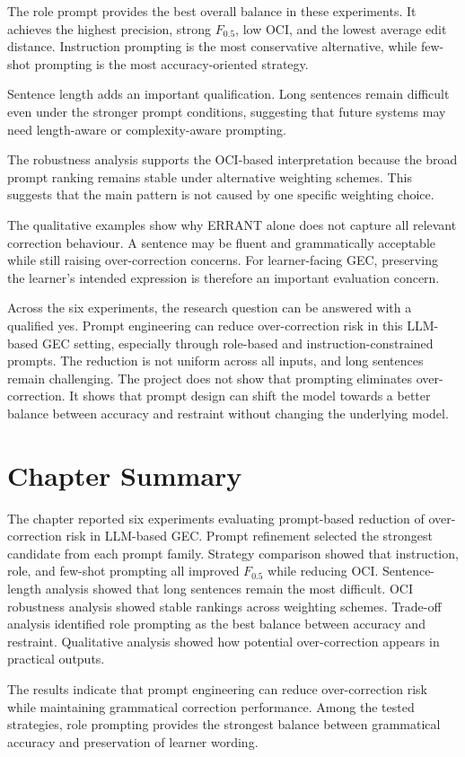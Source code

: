 The role prompt provides the best overall balance in these experiments. It achieves the highest precision, strong $F_{0.5}$, low OCI, and the lowest average edit distance. Instruction prompting is the most conservative alternative, while few-shot prompting is the most accuracy-oriented strategy.

Sentence length adds an important qualification. Long sentences remain difficult even under the stronger prompt conditions, suggesting that future systems may need length-aware or complexity-aware prompting.

The robustness analysis supports the OCI-based interpretation because the broad prompt ranking remains stable under alternative weighting schemes. This suggests that the main pattern is not caused by one specific weighting choice.

The qualitative examples show why ERRANT alone does not capture all relevant correction behaviour. A sentence may be fluent and grammatically acceptable while still raising over-correction concerns. For learner-facing GEC, preserving the learner's intended expression is therefore an important evaluation concern.

Across the six experiments, the research question can be answered with a qualified yes. Prompt engineering can reduce over-correction risk in this LLM-based GEC setting, especially through role-based and instruction-constrained prompts. The reduction is not uniform across all inputs, and long sentences remain challenging. The project does not show that prompting eliminates over-correction. It shows that prompt design can shift the model towards a better balance between accuracy and restraint without changing the underlying model.

\section{Chapter Summary}

The chapter reported six experiments evaluating prompt-based reduction of over-correction risk in LLM-based GEC. Prompt refinement selected the strongest candidate from each prompt family. Strategy comparison showed that instruction, role, and few-shot prompting all improved $F_{0.5}$ while reducing OCI. Sentence-length analysis showed that long sentences remain the most difficult. OCI robustness analysis showed stable rankings across weighting schemes. Trade-off analysis identified role prompting as the best balance between accuracy and restraint. Qualitative analysis showed how potential over-correction appears in practical outputs.

The results indicate that prompt engineering can reduce over-correction risk while maintaining grammatical correction performance. Among the tested strategies, role prompting provides the strongest balance between grammatical accuracy and preservation of learner wording.
